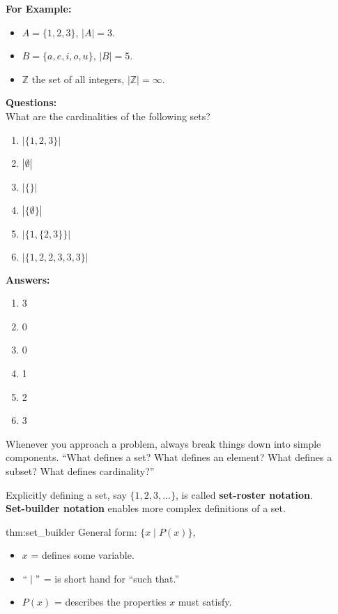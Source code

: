 \noindent
\textbf{For Example:}
\begin{itemize}
    \item $A = \{1, 2, 3\}$, $|A| = 3$.
    \item $B = \{a, e, i, o, u\}$, $|B| = 5$.
    \item $\mathbb{Z}$ the set of all integers, $|\mathbb{Z}| = \infty$.
\end{itemize}

\noindent
\textbf{Questions:}\\
What are the cardinalities of the following sets?
\begin{enumerate}
    \item $|\{1,2,3\}|$
    \item $|\emptyset|$
    \item $|\{\}|$
    \item $|\{\emptyset\}|$
    \item $|\{1,\{2,3\}\}|$
    \item $|\{1,2,2,3,3,3\}|$
\end{enumerate}

\textbf{Answers:}
\begin{enumerate}
    \item 3
    \item 0
    \item 0
    \item 1
    \item 2
    \item 3
\end{enumerate}

\noindent
\begin{Tip}
    Whenever you approach a problem, always break things down into simple components.
    ``What defines a set? What defines an element? What defines a subset? What defines cardinality?''\\
\end{Tip}

\newpage

\noindent
Explicitly defining a set, say $\{1, 2, 3, ...\}$, is called \textbf{set-roster notation}.\\
\textbf{Set-builder notation} enables more complex definitions of a set.

\begin{theo}{thm:set_builder}
    General form: $\{x \mid P(x)\}$,
    \begin{itemize}
        \item $x$ = defines some variable.
        \item $``\mid"$ = is short hand for ``such that.''
        \item $P(x)$ = describes the properties $x$ must satisfy.
    \end{itemize}
\end{theo}

